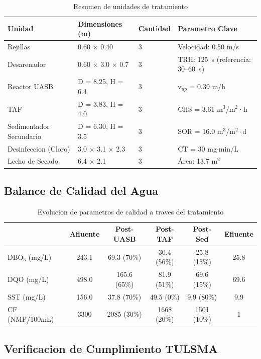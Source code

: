 \documentclass[12pt,a4paper]{article}
\begin{document}
\begin{table}[H]
\centering
\caption{Resumen de unidades de tratamiento}
\small
\begin{tabular}{p{3.2cm}p{3.5cm}p{1.5cm}p{4.8cm}}
\toprule
\textbf{Unidad} & \textbf{Dimensiones (m)} & \textbf{Cantidad} & \textbf{Parametro Clave} \\
\midrule
Rejillas & 0.60 $\times$ 0.40 & 3 & Velocidad: 0.50 m/s \\
Desarenador & 0.60 $\times$ 3.0 $\times$ 0.7 & 3 & TRH: 125~s (referencia: 30--60~s) \\
Reactor UASB & D = 8.25, H = 6.4 & 3 & v$_{up}$ = 0.39 m/h \\
TAF & D = 3.83, H = 4.0 & 3 & CHS = 3.61 m$^3$/m$^2$·h \\
Sedimentador Secundario & D = 6.30, H = 3.5 & 3 & SOR = 16.0 m$^3$/m$^2\cdot$d \\
Desinfeccion (Cloro) & 3.0 $\times$ 3.1 $\times$ 2.3 & 3 & CT = 30 mg$\cdot$min/L \\
Lecho de Secado & 6.4 $\times$ 2.1 & 3 & Área: 13.7 m$^2$ \\
\bottomrule
\end{tabular}
\end{table}

\subsection{Balance de Calidad del Agua}

\begin{table}[H]
\centering
\caption{Evolucion de parametros de calidad a traves del tratamiento}
\begin{tabular}{lccccc}
\toprule
\textbf{} & \textbf{Afluente} & \textbf{Post-UASB} & \textbf{Post-TAF} & \textbf{Post-Sed} & \textbf{Efluente} \\
\midrule
DBO$_5$ (mg/L) & 243.1 & 69.3 (70\%) & 30.4 (56\%) & 25.8 (15\%) & 25.8 \\
DQO (mg/L) & 498.0 & 165.6 (65\%) & 81.9 (51\%) & 69.6 (15\%) & 69.6 \\
SST (mg/L) & 156.0 & 37.8 (70\%) & 49.5 (0\%) & 9.9 (80\%) & 9.9 \\
CF (NMP/100mL) & 3300 & 2085 (30\%) & 1668 (20\%) & 1501 (10\%) & 1 \\
\bottomrule
\end{tabular}
\end{table}

\subsection{Verificacion de Cumplimiento TULSMA}
\end{document}
